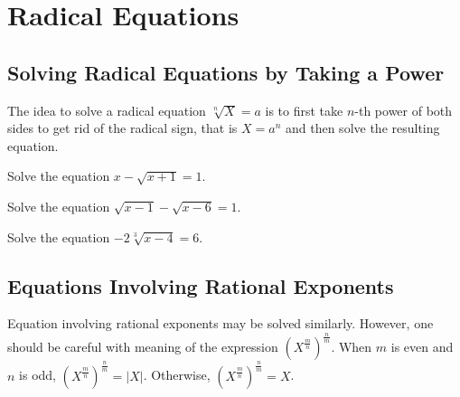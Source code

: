 
\hypertarget{radical-equations}{%
\section{Radical Equations}\label{radical-equations}}

\hypertarget{solving-radical-equations-by-taking-a-power}{%
\subsection{Solving Radical Equations by Taking a
Power}\label{solving-radical-equations-by-taking-a-power}}

The idea to solve a radical equation \(\sqrt[n]{X}=a\) is to first take
\(n\)-th power of both sides to get rid of the radical sign, that is
\(X=a^n\) and then solve the resulting equation.

\begin{example}

Solve the equation \(x-\sqrt{x+1}=1.\)

\end{example}
\vspace*{5\baselineskip}

\begin{example}

Solve the equation \(\sqrt{x-1}-\sqrt{x-6}=1.\)

\end{example}
\vspace*{5\baselineskip}

\begin{example}

Solve the equation \(-2\sqrt[3]{x-4}=6.\)

\end{example}
\vspace*{5\baselineskip}

\hypertarget{equations-involving-rational-exponents}{%
\subsection{Equations Involving Rational
Exponents}\label{equations-involving-rational-exponents}}

Equation involving rational exponents may be solved similarly. However,
one should be careful with meaning of the expression
\(\left(X^{\frac mn}\right)^{\frac nm}\). When \(m\) is even and \(n\)
is odd, \(\left(X^{\frac mn}\right)^{\frac nm}=|X|\). Otherwise,
\(\left(X^{\frac mn}\right)^{\frac nm}=X\).

